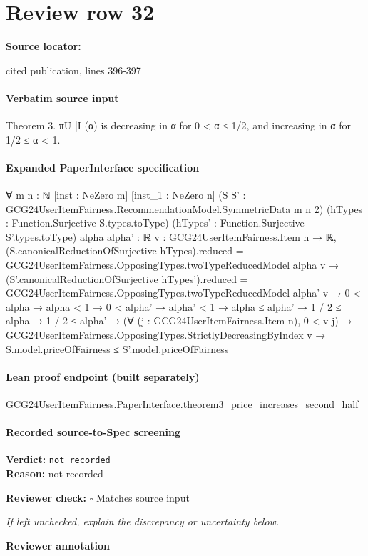 \documentclass[10pt]{article}
\newcommand{\reviewerbox}{%
  \par\noindent\fbox{\parbox{0.96\linewidth}{\rule{0pt}{0.38in}}}\par
}
\newcommand{\reviewmatch}[1]{%
  \par\noindent\textbf{Reviewer check:} $\square$\; #1\par
  \noindent\emph{If left unchecked, explain the discrepancy or uncertainty below.}\par
}
\begin{document}
\section*{Review row 32}
\textbf{Source locator:} {\footnotesize\raggedright cited publication, lines 396-\allowbreak{}397\par}
\paragraph{Verbatim source input}
\begin{ReviewVerbatim}
Theorem 3. πU
|I (α) is decreasing in α for 0 < α ≤ 1/2, and increasing in α for 1/2 ≤ α < 1.
\end{ReviewVerbatim}


\paragraph{Expanded PaperInterface specification}
\begin{ReviewVerbatim}
∀ {m n : ℕ} [inst : NeZero m] [inst_1 : NeZero n] (S S' : GCG24UserItemFairness.RecommendationModel.SymmetricData m n 2)
  (hTypes : Function.Surjective S.types.toType) (hTypes' : Function.Surjective S'.types.toType) {alpha alpha' : ℝ}
  {v : GCG24UserItemFairness.Item n → ℝ},
  (S.canonicalReductionOfSurjective hTypes).reduced = GCG24UserItemFairness.OpposingTypes.twoTypeReducedModel alpha v →
    (S'.canonicalReductionOfSurjective hTypes').reduced =
        GCG24UserItemFairness.OpposingTypes.twoTypeReducedModel alpha' v →
      0 < alpha →
        alpha < 1 →
          0 < alpha' →
            alpha' < 1 →
              alpha ≤ alpha' →
                1 / 2 ≤ alpha →
                  1 / 2 ≤ alpha' →
                    (∀ (j : GCG24UserItemFairness.Item n), 0 < v j) →
                      GCG24UserItemFairness.OpposingTypes.StrictlyDecreasingByIndex v →
                        S.model.priceOfFairness ≤ S'.model.priceOfFairness
\end{ReviewVerbatim}

\paragraph{Lean proof endpoint (built separately)}\begin{ReviewVerbatim}
GCG24UserItemFairness.PaperInterface.theorem3_price_increases_second_half
\end{ReviewVerbatim}

\paragraph{Recorded source-to-Spec screening}
\textbf{Verdict:} \texttt{not recorded}
\\
\textbf{Reason:} not recorded
\reviewmatch{Matches source input}
\noindent\textbf{Reviewer annotation}\par
\reviewerbox
\clearpage
\hypertarget{source-claim-eae0a47427c4efe2}{}
\end{document}
